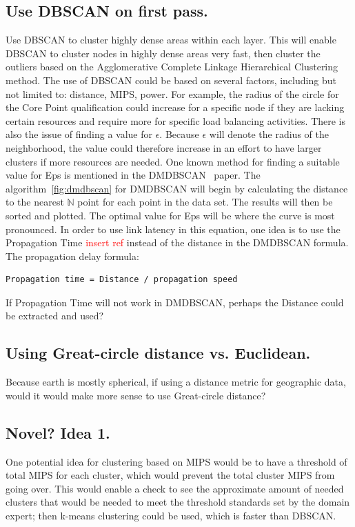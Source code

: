 \documentclass[letterpaper,twocolumn,10pt]{article}
\newcommand\todo[1]{\textcolor{red}{#1}}
\begin{document}
\subsection{Use DBSCAN on first pass.}
Use DBSCAN to cluster highly dense areas within each layer. This will enable DBSCAN to cluster nodes in highly dense areas very fast, then cluster the outliers based on the Agglomerative Complete Linkage Hierarchical Clustering method. The use of DBSCAN could be based on several factors, including but not limited to: distance, MIPS, power. For example, the radius of the circle for the Core Point qualification could increase for a specific node if they are lacking certain resources and require more for specific load balancing activities. There is also the issue of finding a value for $\epsilon$. Because $\epsilon$ will denote the radius of the neighborhood, the value could therefore increase in an effort to have larger clusters if more resources are needed. One known method for finding a suitable value for Eps is mentioned in the DMDBSCAN~\cite{dmdbscan} paper. The algorithm~\ref{fig:dmdbscan} for DMDBSCAN will begin by calculating the distance to the nearest $\mathbb{N}$ point for each point in the data set. The results will then be sorted and plotted. The optimal value for Eps will be where the curve is most pronounced. In order to use link latency in this equation, one idea is to use the Propagation Time \todo{insert ref} instead of the distance in the DMDBSCAN formula. The propagation delay formula:
\begin{verbatim}
Propagation time = Distance / propagation speed 
\end{verbatim}
If Propagation Time will not work in DMDBSCAN, perhaps the Distance could be extracted and used?
 
\subsection{Using Great-circle distance vs. Euclidean.}Because earth is mostly spherical, if using a distance metric for geographic data, would it would make more sense to use Great-circle distance?

\subsection{Novel? Idea 1.} One potential idea for clustering based on MIPS would be to have a threshold of total MIPS for each cluster, which would prevent the total cluster MIPS from going over. This would enable a check to see the approximate amount of needed clusters that would be needed to meet the threshold standards set by the domain expert; then k-means clustering could be used, which is faster than DBSCAN.
\end{document}
